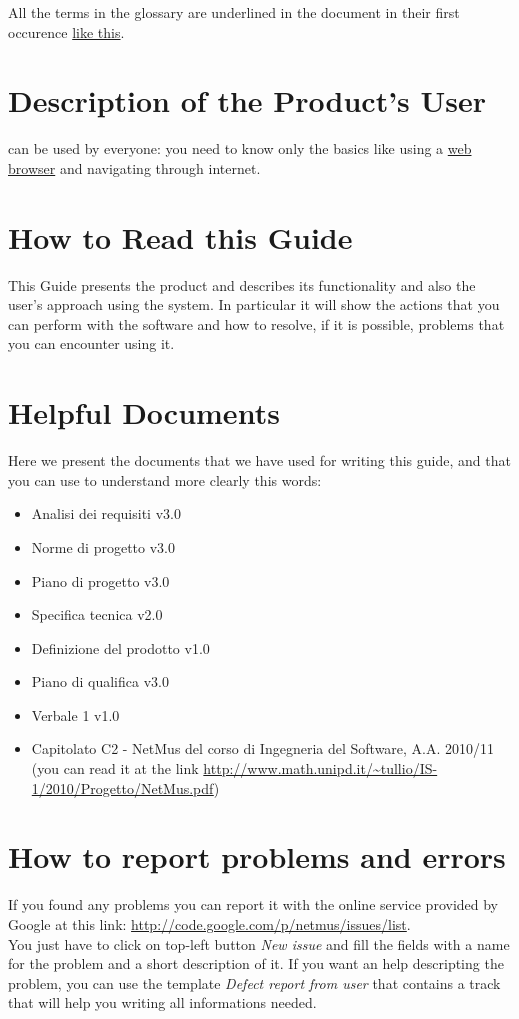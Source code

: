 All the terms in the glossary are underlined in the document in their first
occurence \underline{like this}.

\section{Description of the Product's User}
 can be used by everyone: you need to know only the basics like using
a \underline{web browser} and navigating through internet. 


\section{How to Read this Guide}
This Guide presents the product  and describes its functionality and
also the user's approach using the system. In particular it will show the 
actions that you can perform with the software and how to resolve, if it is
possible, problems that you can encounter using it.

\section{Helpful Documents}
Here we present the documents that we have used for writing this guide, and that
you can use to understand more clearly this words:
\begin{itemize}
  \item Analisi dei requisiti v3.0
  \item Norme di progetto v3.0
  \item Piano di progetto v3.0
  \item Specifica tecnica v2.0
  \item Definizione del prodotto v1.0
  \item Piano di qualifica v3.0
  \item Verbale 1 v1.0
  \item Capitolato C2 - NetMus del corso di Ingegneria del Software, A.A.
2010/11 (you can read it at the link 
\url{http://www.math.unipd.it/~tullio/IS-1/2010/Progetto/NetMus.pdf})
\end{itemize}

\section{How to report problems and errors}
If you found any problems you can report it with the online service provided by
Google at this link:  \url{http://code.google.com/p/netmus/issues/list}.\\
You just have to click on top-left button \emph{New issue} and fill the
fields with a name for the problem and a short description of it.
If you want an help descripting the problem, you can use the template
\emph{Defect report from user} that contains a track that will help you writing all 
informations needed. 

